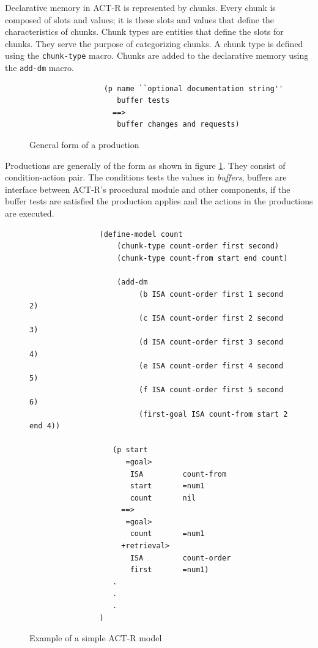 Declarative memory in ACT-R is represented by
chunks\cite{actr-tut}. Every chunk is composed of slots and values; it
is these slots and values that define the characteristics of
chunks. Chunk types are entities that define the slots for
chunks. They serve the purpose of categorizing
chunks\cite{actr-tut}. A chunk type is defined using the
\texttt{chunk-type} macro. Chunks are added to the declarative memory
using the \texttt{add-dm} macro. 

\begin{figure}
\label{production_fig}
\centering
\begin{center}
\begin{verbatim}
                 (p name ``optional documentation string''
                    buffer tests
                   ==>
                    buffer changes and requests)
\end{verbatim}
\end{center}
\caption{General form of a production\cite{actr-tut}}
\end{figure}

Productions are generally of the form as shown in figure
\ref{production_fig}. They consist of condition-action pair. The
conditions tests the values in \emph{buffers}, buffers are interface between
ACT-R's procedural module and other components, if the buffer tests
are satisfied the production applies and the actions in the
productions are executed.

\begin{figure}
  \centering
\begin{verbatim}
                (define-model count
                    (chunk-type count-order first second)
                    (chunk-type count-from start end count)

                    (add-dm
                         (b ISA count-order first 1 second 2)
                         (c ISA count-order first 2 second 3)
                         (d ISA count-order first 3 second 4)
                         (e ISA count-order first 4 second 5)
                         (f ISA count-order first 5 second 6)
                         (first-goal ISA count-from start 2 end 4))

                   (p start
                      =goal>
                       ISA         count-from
                       start       =num1
                       count       nil
                     ==>
                      =goal>
                       count       =num1
                     +retrieval>
                       ISA         count-order
                       first       =num1)
                   .
                   . 
                   .
                )

\end{verbatim}
  \label{act-r-model}
  \caption{Example of a simple ACT-R model}
\end{figure}


